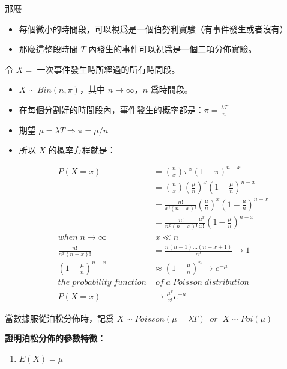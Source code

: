 \documentclass[]{ctexbook}
\providecommand{\tightlist}{%
  \setlength{\itemsep}{0pt}\setlength{\parskip}{0pt}}
\begin{document}
那麼

\begin{itemize}
\tightlist
\item
  每個微小的時間段，可以視爲是一個伯努利實驗（有事件發生或者沒有）
\item
  那麼這整段時間 \(T\) 內發生的事件可以視爲是一個二項分佈實驗。
\end{itemize}

令 \(X=\) 一次事件發生時所經過的所有時間段。

\begin{itemize}
\tightlist
\item
  \(X \sim Bin(n, \pi)\)，其中 \(n\rightarrow\infty\)，\(n\) 爲時間段。
\item
  在每個分割好的時間段內，事件發生的概率都是：\(\pi=\frac{\lambda T}{n}\)
\item
  期望 \(\mu=\lambda T \Rightarrow \pi=\mu/n\)
\item
  所以 \(X\) 的概率方程就是：

  \begin{align}
  P(X=x) &= \binom{n}{x}\pi^x(1-\pi)^{n-x} \\
     &= \binom{n}{x}(\frac{\mu}{n})^x(1-\frac{\mu}{n})^{n-x} \\
     &= \frac{n!}{x!(n-x)!}(\frac{\mu}{n})^x(1-\frac{\mu}{n})^{n-x} \\
     &=\frac{n!}{n^x(n-x)!}\frac{\mu^x}{x!}(1-\frac{\mu}{n})^{n-x}\\
  when\; n\rightarrow\infty   &\; x \ll n\\
  \frac{n!}{n^x(n-x)!} &=\frac{n(n-1)\dots(n-x+1)}{n^x} \rightarrow 1\\
  (1-\frac{\mu}{n})^{n-x} &\approx  (1-\frac{\mu}{n})^n \rightarrow e^{-\mu}\\
  the\;probability\;function&\;of\;a\;Poisson\;distribution   \\
  P(X=x) &\rightarrow \frac{\mu^x}{x!}e^{-\mu}
  \end{align}
\end{itemize}

當數據服從泊松分佈時，記爲
\(X\sim Poisson(\mu=\lambda T)\;\; or\;\; X\sim Poi(\mu)\)

\textbf{證明泊松分佈的參數特徵：}

\begin{enumerate}
\def\labelenumi{\arabic{enumi}.}
\tightlist
\item
  \(E(X)=\mu\)
\end{enumerate}
\end{document}
